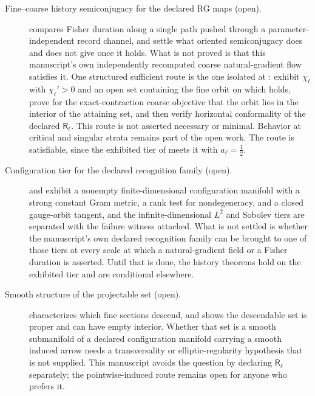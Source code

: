 \begin{description}
\item[Fine--coarse history semiconjugacy for the declared RG maps (open).]
 compares Fisher duration along a
single path pushed through a parameter-independent record channel, and
settle what oriented semiconjugacy does and does not give once it holds.  What
is not proved is that this manuscript's own independently recomputed coarse
natural-gradient flow satisfies it.  One structured sufficient route is the
one isolated at : exhibit
\(\chi_\ell\) with \(\chi_\ell'>0\) and an open set containing the fine orbit on
which  holds, prove for the
exact-contraction coarse objective that the orbit lies in the interior of the
attaining set, and then verify horizontal conformality of the declared
\(\mathsf R_\ell\).  This route is not asserted necessary or minimal.  Behavior
at critical and singular strata remains part of the open work.  The route is
satisfiable, since the exhibited tier of
 meets it with
\(a_\ell=\tfrac12\). 

\item[Configuration tier for the declared recognition family (open).]
 and
 exhibit a nonempty finite-dimensional
configuration manifold with a strong constant Gram metric, a rank test for
nondegeneracy, and a closed gauge-orbit tangent, and the infinite-dimensional
\(L^2\) and Sobolev tiers are separated with the failure witness attached.
What is not settled is whether the manuscript's own declared recognition family
can be brought to one of those tiers at every scale at which a natural-gradient
field or a Fisher duration is asserted.  Until that is done, the history
theorems hold on the exhibited tier and are conditional elsewhere.

\item[Smooth structure of the projectable set (open).]
 characterizes which fine sections descend, and
 shows the descendable set is proper and can
have empty interior.  Whether that set is a smooth submanifold of a declared
configuration manifold carrying a smooth induced arrow needs a transversality
or elliptic-regularity hypothesis that is not supplied.  This manuscript avoids
the question by declaring \(\mathsf R_\ell\) separately; the pointwise-induced
route remains open for anyone who prefers it. 


\end{description}
